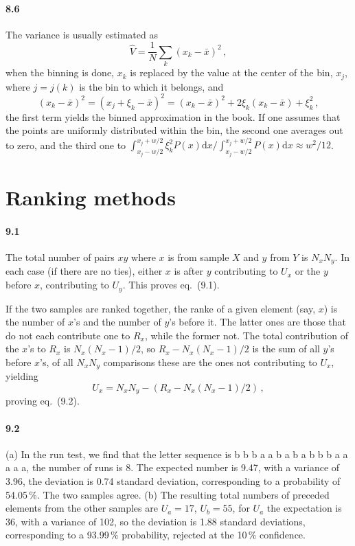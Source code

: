 \documentclass[a4paper,12pt]{article}
\def\d{\mathrm{d}}
\begin{document}
\paragraph{8.6} The variance is usually estimated as
\[
 \hat V = \frac{1}{N}\sum_k (x_k - \bar{x})^2\,,
\]
when the binning is done, $x_k$ is replaced by the value at the center of the bin, $x_j$, where $j=j(k)$ is the bin to which it belongs, and
\[
 (x_k - \bar{x})^2 = (x_j + \xi_k - \bar{x})^2 = (x_k-\bar{x})^2 + 2 \xi_k (x_k-\bar{x}) + \xi_k^2\,,
\]
the first term yields the binned approximation in the book. If one assumes that the points are uniformly distributed within the bin, the second one averages out to zero, and the third one to $\int_{x_j-w/2}^{x_j+w/2}\xi_k^2 P(x)\d x / \int_{x_j-w/2}^{x_j+w/2}P(x)\d x \approx w^2/12$.


\section{Ranking methods}


\paragraph{9.1} The total number of pairs $xy$ where $x$ is from sample $X$ and $y$ from $Y$ is $N_x N_y$. In each case (if there are no ties), either $x$ is after $y$ contributing to $U_x$ or the $y$ before $x$, contributing to $U_y$. This proves eq.\ (9.1).

If the two samples are ranked together, the ranke of a given element (say, $x$) is the number of $x$'s and the number of $y$'s before it. The latter ones are those that do not each contribute one to $R_x$, while the former not. The total contribution of the $x$'s to $R_x$ is $N_x(N_x-1)/2$, so $R_x - N_x(N_x-1)/2$ is the sum of all $y$'s before $x$'s, of all $N_x N_y$ comparisons these are the ones not contributing to $U_x$, yielding
\[
 U_x = N_x N_y - (R_x - N_x(N_x-1)/2)\,,
\]
proving eq.\ (9.2).


\paragraph{9.2} (a) In the run test, we find that the letter sequence is b b b a a b a b a b b b a a a a a, the number of runs is 8. The expected number is 9.47, with a variance of 3.96, the deviation is 0.74 standard deviation, corresponding to a probability of 54.05\,\%. The two samples agree. (b) The resulting total numbers of preceded elements from the other samples are $U_a = 17$, $U_b = 55$, for $U_a$ the expectation is 36, with a variance of 102, so the deviation is 1.88 standard deviations, corresponding to a 93.99\,\% probability, rejected at the 10\,\% confidence.
\end{document}

